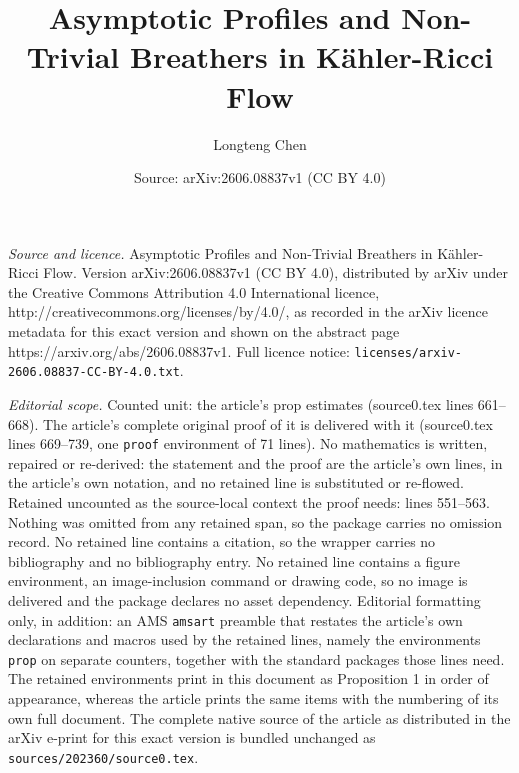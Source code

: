 \documentclass[10pt,a4paper]{amsart}
\title{Asymptotic Profiles and Non-Trivial Breathers in Kähler-Ricci Flow}
\author{Longteng Chen}
\date{Source: arXiv:2606.08837v1 (CC BY 4.0)}
\begin{document}
\maketitle

\noindent\emph{Source and licence.} Asymptotic Profiles and Non-Trivial Breathers in Kähler-Ricci Flow. Version arXiv:2606.08837v1 (CC BY 4.0), distributed by arXiv under the Creative Commons Attribution 4.0 International licence, http://creativecommons.org/licenses/by/4.0/, as recorded in the arXiv licence metadata for this exact version and shown on the abstract page https://arxiv.org/abs/2606.08837v1. Full licence notice: \texttt{licenses/arxiv-2606.08837-CC-BY-4.0.txt}.\par\smallskip

\noindent\textit{Editorial scope.} Counted unit: the article's prop estimates (source0.tex lines 661--668). The article's complete original proof of it is delivered with it (source0.tex lines 669--739, one \texttt{proof} environment of 71 lines). No mathematics is written, repaired or re-derived: the statement and the proof are the article's own lines, in the article's own notation, and no retained line is substituted or re-flowed.  Retained uncounted as the source-local context the proof needs: lines 551--563.  Nothing was omitted from any retained span, so the package carries no omission record.  No retained line contains a citation, so the wrapper carries no bibliography and no bibliography entry.  No retained line contains a figure environment, an image-inclusion command or drawing code, so no image is delivered and the package declares no asset dependency.  Editorial formatting only, in addition: an AMS \texttt{amsart} preamble that restates the article's own declarations and macros used by the retained lines, namely the environments \texttt{prop} on separate counters, together with the standard packages those lines need.  The retained environments print in this document as Proposition 1 in order of appearance, whereas the article prints the same items with the numbering of its own full document.  The complete native source of the article as distributed in the arXiv e-print for this exact version is bundled unchanged as \texttt{sources/202360/source0.tex}.
\end{document}
